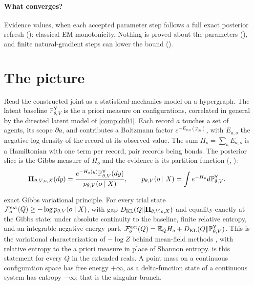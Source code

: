 \paragraph{What converges?}
Evidence values, when each accepted parameter step follows a full exact posterior refresh
(): classical EM monotonicity. Nothing is proved about the
parameters (), and finite natural-gradient steps can lower
the bound ().

\section{The picture}
\label{comp:ch05-picture}

Read the constructed joint as a statistical-mechanics model on a hypergraph. The latent baseline
$\mathbb P^{\mathsf Y}_{\theta,V}$ is the a priori measure on configurations, correlated in general
by the directed latent model of \cref{comp:ch04}. Each record $a$ touches a set of agents, its scope
$\partial a$, and contributes a Boltzmann factor $e^{-E_{a,o}(y_{\partial a})}$, with $E_{a,o}$ the
negative log density of the record at its observed value. The sum $H_o=\sum_aE_{a,o}$ is a
Hamiltonian with one term per record, pair records being bonds. The posterior slice is the Gibbs
measure of $H_o$ and the evidence is its partition function (,
):
\[
\boldsymbol\Pi_{\theta,V,o,X}(dy)=\frac{e^{-H_o(y)}\mathbb P^{\mathsf Y}_{\theta,V}(dy)}{p_{\theta,V}(o\mid X)},
\qquad
p_{\theta,V}(o\mid X)=\int e^{-H_o}d\mathbb P^{\mathsf Y}_{\theta,V}.
\]

\begin{analogy}{exact}
Gibbs variational principle. For every trial state
$\mathcal F^{\mathrm{ext}}_o(Q)\geq-\log p_{\theta,V}(o\mid X)$, with gap $D_{\mathrm{KL}}(Q\Vert\boldsymbol\Pi_{\theta,V,o,X})$
and equality exactly at the Gibbs state; under absolute continuity to the baseline, finite relative
entropy, and an integrable negative energy part,
$\mathcal F^{\mathrm{ext}}_o(Q)=\mathbb E_QH_o+D_{\mathrm{KL}}(Q\Vert\mathbb P^{\mathsf Y}_{\theta,V})$. This is the variational
characterization of $-\log Z$ behind mean-field methods \citep{Wainwright2008}, with relative entropy to
the a priori measure in place of Shannon entropy.  is this statement for every
$Q$ in the extended reals. A point mass on a continuous configuration space
has free energy $+\infty$, as a delta-function state of a continuous system has entropy $-\infty$; that
is the singular branch.
\end{analogy}

